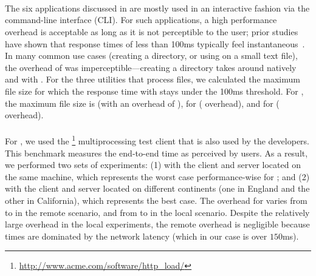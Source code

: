
\paragraph{\gnu~\coreutils} The six \coreutils applications discussed in 
 are mostly used in an interactive fashion via the
command-line interface (CLI). For such applications, a high performance
overhead is acceptable as long as it is not perceptible to the user;
prior studies have shown that response times of less than 100ms
typically feel instantaneous~\cite{card:human_proc}. In many common use
cases (\eg creating a directory, or using \cut on a small text file),
the overhead of \mx was imperceptible---\eg creating a directory takes
around \avgMkdirNative natively and \avgMkdirMx with \mx. For the three
utilities that process files, we calculated the maximum file size for
which the response time with \mx stays under the 100ms threshold.  For
\cut, the maximum file size is \cutCutoffSize (with an overhead of
\cutCutoffOver), for \mdsum \mdsumCutoffSize (\mdsumCutoffOver
overhead), and for \shasum \shasumCutoffSize (\shasumCutoffOver
overhead).

\paragraph{\lighttpd} For \lighttpd, we used the
\httpload\footnote{\url{http://www.acme.com/software/http_load/}}
multiprocessing test client that is also used by the \lighttpd developers. This
benchmark measures the end-to-end time as perceived by users. As a result, we
performed two sets of experiments: (1) with the client and server located on
the same machine, which represents the worst case performance-wise for \mx; and
(2) with the client and server located on different continents (one in England
and the other in California), which represents the best case. The overhead for
\lighttpd varies from \minLighttpdRemote to \maxLighttpdRemote in the remote
scenario, and from \minLighttpdOver to \maxLighttpdOver in the local scenario.
Despite the relatively large overhead in the local experiments, the remote
overhead is negligible because times are dominated by the network latency
(which in our case is over $150$ms).

